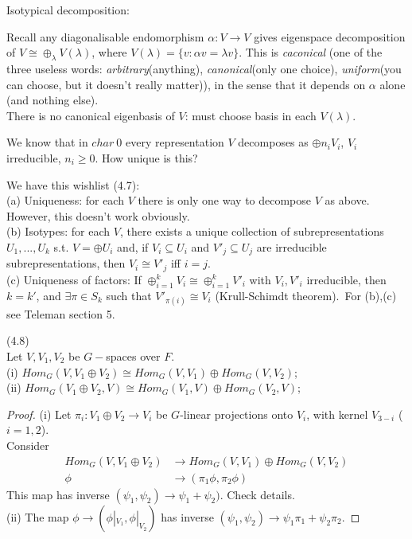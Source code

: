 \documentclass[a4paper]{article}
\begin{document}
Isotypical decomposition:

Recall any diagonalisable endomorphism $\alpha:V \to V$ gives eigenspace decomposition of $V \cong \oplus_\lambda V(\lambda)$, where $V(\lambda) = \{v:\alpha v = \lambda v\}$. This is \emph{caconical} (one of the three useless words: \emph{arbitrary}(anything), \emph{canonical}(only one choice), \emph{uniform}(you can choose, but it doesn't really matter)), in the sense that it depends on $\alpha$ alone (and nothing else).\\
There is no canonical eigenbasis of $V$: must choose basis in each $V(\lambda)$.

We know that in $char\ 0$ every representation $V$ decomposes as $\oplus n_i V_i$, $V_i$ irreducible, $n_i \geq 0$. How unique is this?

We have this wishlist (4.7):\\
(a) Uniqueness: for each $V$ there is only one way to decompose $V$ as above. However, this doesn't work obviously.\\
(b) Isotypes: for each $V$, there exists a unique collection of subrepresentations $U_1,...,U_k$ s.t. $V=\oplus U_i$ and, if $V_i \subseteq U_i$ and $V'_j \subseteq U_j$ are irreducible subrepresentations, then $V_i \cong V'_j$ iff $i = j$.\\
(c) Uniqueness of factors: If $\oplus_{i=1}^k V_i \cong \oplus_{i=1}^k V'_i$ with $V_i,V'_i$ irreducible, then $k=k'$, and $\exists \pi \in S_k$ such that $V'_{\pi(i)} \cong V_i$ (Krull-Schimdt theorem).\
For (b),(c) see Teleman section 5.

\begin{lemma} (4.8)\\
Let $V,V_1,V_2$ be $G-$spaces over $F$.\\
(i) $Hom_G(V,V_1 \oplus V_2) \cong Hom_G (V,V_1) \oplus Hom_G(V,V_2)$;\\
(ii) $Hom_G(V_1\oplus V_2, V) \cong Hom_G(V_1,V) \oplus Hom_G(V_2,V)$;\\
\begin{proof}
(i) Let $\pi_i: V_1 \oplus V_2 \to V_i$ be $G$-linear projections onto $V_i$, with kernel $V_{3-i}$ ($i=1,2$).\\
Consider 
\begin{equation*}
\begin{aligned}
Hom_G (V,V_1 \oplus V_2) &\to Hom_G (V,V_1) \oplus Hom_G (V,V_2)\\
\phi &\to (\pi_1 \phi, \pi_2 \phi)
\end{aligned}
\end{equation*}
This map has inverse $(\psi_1,\psi_2) \to \psi_1+\psi_2)$. Check details.\\
(ii) The map $\phi \to (\phi|_{V_1},\phi|_{V_2})$ has inverse $(\psi_1,\psi_2) \to \psi_1\pi_1+\psi_2\pi_2$.
\end{proof}
\end{lemma}
\end{document}
